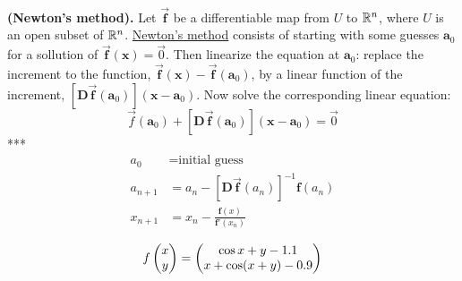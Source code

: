 \\

\begin{defn}
  \textbf{(Newton's method).} Let $\bm{\vec{f}}$ be a differentiable map from $U$ to $\mathbb{R}^n$, where $U$ is an open subset of $\mathbb{R}^n$. \ul{Newton's method} consists of starting with some guesses $\bm{a}_0$ for a sollution of $\bm{\vec{f}}(\bm{x})=\vec{0}$. Then linearize the equation at $\bm{a}_0$: replace the increment to the function, $\bm{\vec{f}}(\bm{x})-\bm{\vec{f}}(\bm{a}_0)$, by a linear function of the increment, $[\bm{D\vec{f}}(\bm{a}_0)](\bm{x}-\bm{a}_0)$. Now solve the corresponding linear equation:
  \[\vec{f}(\bm{a}_0)+[\bm{D\vec{f}}(\bm{a}_0)](\bm{x}-\bm{a}_0)=\vec{0}\]
  ***
  \begin{align*}
    a_0 &= \text{initial guess} \\
    a_{n+1} &= a_n - [\bm{D\vec{f}}(a_n)]^{-1} \bm{f}(a_n) \\
    x_{n+1} &= x_n - \frac{\bm{f}(x)}{\bm{f}'(x_n)}
  \end{align*}
\end{defn}

\example
\[f\begin{pmatrix} x \\ y \end{pmatrix} = \begin{pmatrix} \cos x + y - 1.1 \\  x + \cos (x + y) - 0.9 \end{pmatrix}\]
